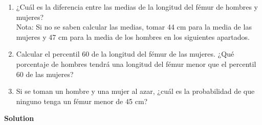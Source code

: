 \documentclass[12pt,a4paper]{article}
\begin{document}
\begin{enumerate}
  \begin{enumerate}
  \item
    ¿Cuál es la diferencia entre las medias de la longitud del fémur de
    hombres y mujeres?\\
    Nota: Si no se saben calcular las medias, tomar 44 cm para la media
    de las mujeres y 47 cm para la media de los hombres en los
    siguientes apartados.
  \item
    Calcular el percentil 60 de la longitud del fémur de las mujeres.
    ¿Qué porcentaje de hombres tendrá una longitud del fémur menor que
    el percentil 60 de las mujeres?
  \item
    Si se toman un hombre y una mujer al azar, ¿cuál es la probabilidad
    de que ninguno tenga un fémur menor de 45 cm?
  \end{enumerate}

  \textbf{Solution}\\
\end{enumerate}
\end{document}

